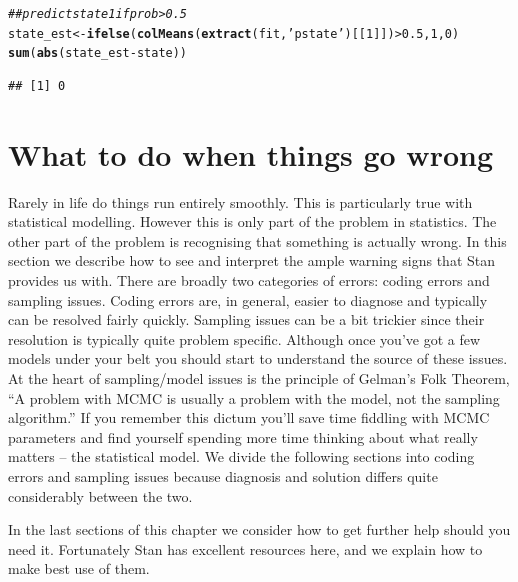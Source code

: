 \documentclass[11pt,fullpage]{book}
\makeatletter
\newenvironment{kframe}{%
	\def\at@end@of@kframe{}%
	\ifinner\ifhmode%
	\def\at@end@of@kframe{\end{minipage}}%
\begin{minipage}{\columnwidth}%
	\fi\fi%
	\def\FrameCommand##1{\hskip\@totalleftmargin \hskip-\fboxsep
		\colorbox{shadecolor}{##1}\hskip-\fboxsep
		\hskip-\linewidth \hskip-\@totalleftmargin \hskip\columnwidth}%
	\MakeFramed {\advance\hsize-\width
		\@totalleftmargin\z@ \linewidth\hsize
		\@setminipage}}%
{\par\unskip\endMakeFramed%
	\at@end@of@kframe}
\newcommand{\hlnum}[1]{\textcolor[rgb]{0.686,0.059,0.569}{#1}}%
\newcommand{\hlstr}[1]{\textcolor[rgb]{0.192,0.494,0.8}{#1}}%
\newcommand{\hlcom}[1]{\textcolor[rgb]{0.678,0.584,0.686}{\textit{#1}}}%
\newcommand{\hlopt}[1]{\textcolor[rgb]{0,0,0}{#1}}%
\newcommand{\hlstd}[1]{\textcolor[rgb]{0.345,0.345,0.345}{#1}}%
\newcommand{\hlkwb}[1]{\textcolor[rgb]{0.69,0.353,0.396}{#1}}%
\newcommand{\hlkwd}[1]{\textcolor[rgb]{0.737,0.353,0.396}{\textbf{#1}}}%
\newenvironment{knitrout}{}{} %
\makeatother
\begin{document}
\begin{knitrout}\small
		\color{fgcolor}\begin{kframe}
\begin{alltt}
\hlcom{## predict state 1 if prob>0.5}
\hlstd{state_est} \hlkwb{<-} \hlkwd{ifelse}\hlstd{(}\hlkwd{colMeans}\hlstd{(}\hlkwd{extract}\hlstd{(fit,}\hlstr{'pstate'}\hlstd{)[[}\hlnum{1}\hlstd{]])}\hlopt{>}\hlnum{0.5}\hlstd{,}\hlnum{1}\hlstd{,}\hlnum{0}\hlstd{)}
\hlkwd{sum}\hlstd{(}\hlkwd{abs}\hlstd{(state_est} \hlopt{-} \hlstd{state))}
\end{alltt}
\begin{verbatim}
## [1] 0
\end{verbatim}
		\end{kframe}
	\end{knitrout}

\section{What to do when things go wrong}
Rarely in life do things run entirely smoothly. This is particularly true with statistical modelling. However this is only part of the problem in statistics. The other part of the problem is recognising that something is actually wrong. In this section we describe how to see and interpret the ample warning signs that Stan provides us with. There are broadly two categories of errors: coding errors and sampling issues. Coding errors are, in general, easier to diagnose and typically can be resolved fairly quickly. Sampling issues can be a bit trickier since their resolution is typically quite problem specific. Although once you've got a few models under your belt you should start to understand the source of these issues. At the heart of sampling/model issues is the principle of Gelman's Folk Theorem, ``A problem with MCMC is usually a problem with the model, not the sampling algorithm.'' If you remember this dictum you'll save time fiddling with MCMC parameters and find yourself spending more time thinking about what really matters -- the statistical model. We divide the following sections into coding errors and sampling issues because diagnosis and solution differs quite considerably between the two. 

In the last sections of this chapter we consider how to get further help should you need it. Fortunately Stan has excellent resources here, and we explain how to make best use of them.

 
\end{document}
